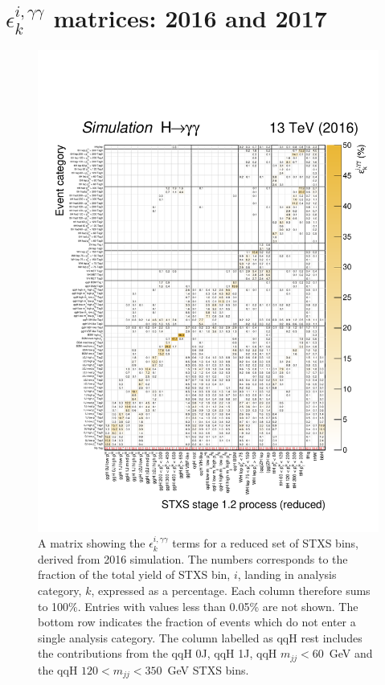 \chapter{$\epsilon^{i,\gamma\gamma}_k$ matrices: 2016 and 2017}\label{app:eff_acc}

\begin{figure}[hptb]
  \centering
  \includegraphics[width=1\textwidth]{Figures/hgg_stats/migrationMatrix_2016_thesis.pdf}
  \caption[Efficiency times acceptance matrix from 2016 simulation]
  {
    A matrix showing the $\epsilon^{i,\gamma\gamma}_{k}$ terms for a reduced set of STXS bins, derived from 2016 simulation. The numbers corresponds to the fraction of the total yield of STXS bin, $i$, landing in analysis category, $k$, expressed as a percentage. Each column therefore sums to 100\%. Entries with values less than 0.05\% are not shown. The bottom row indicates the fraction of events which do not enter a single analysis category. The column labelled as qqH rest includes the contributions from the qqH 0J, qqH 1J, qqH $m_{jj}<60$~GeV and the qqH $120<m_{jj}<350$~GeV STXS bins.
  }
  \label{fig:ea_2018}
\end{figure}

